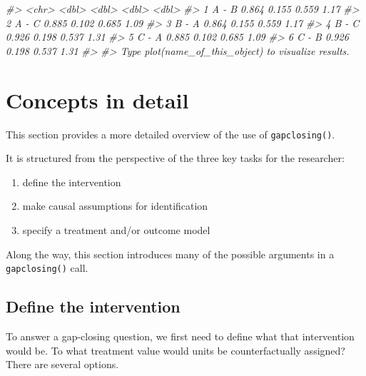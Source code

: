 \documentclass[
]{article}
\newenvironment{Shaded}{\begin{snugshade}}{\end{snugshade}}
\newcommand{\CommentTok}[1]{\textcolor[rgb]{0.56,0.35,0.01}{\textit{#1}}}
\providecommand{\tightlist}{%
  \setlength{\itemsep}{0pt}\setlength{\parskip}{0pt}}
\begin{document}
\begin{Shaded}
\begin{Highlighting}[]
\CommentTok{\#\textgreater{}   \textless{}chr\textgreater{}       \textless{}dbl\textgreater{} \textless{}dbl\textgreater{}  \textless{}dbl\textgreater{}  \textless{}dbl\textgreater{}}
\CommentTok{\#\textgreater{} 1 A {-} B       0.864 0.155  0.559   1.17}
\CommentTok{\#\textgreater{} 2 A {-} C       0.885 0.102  0.685   1.09}
\CommentTok{\#\textgreater{} 3 B {-} A       0.864 0.155  0.559   1.17}
\CommentTok{\#\textgreater{} 4 B {-} C       0.926 0.198  0.537   1.31}
\CommentTok{\#\textgreater{} 5 C {-} A       0.885 0.102  0.685   1.09}
\CommentTok{\#\textgreater{} 6 C {-} B       0.926 0.198  0.537   1.31}
\CommentTok{\#\textgreater{} }
\CommentTok{\#\textgreater{} Type plot(name\_of\_this\_object) to visualize results.}
\end{Highlighting}
\end{Shaded}

\hypertarget{concepts-in-detail}{%
\section{Concepts in detail}\label{concepts-in-detail}}

This section provides a more detailed overview of the use of \texttt{gapclosing()}.

It is structured from the perspective of the three key tasks for the researcher:

\begin{enumerate}
\def\labelenumi{\arabic{enumi}.}
\tightlist
\item
  define the intervention
\item
  make causal assumptions for identification
\item
  specify a treatment and/or outcome model
\end{enumerate}

Along the way, this section introduces many of the possible arguments in a \texttt{gapclosing()} call.

\hypertarget{define-the-intervention}{%
\subsection{Define the intervention}\label{define-the-intervention}}

To answer a gap-closing question, we first need to define what that intervention would be. To what treatment value would units be counterfactually assigned? There are several options.
\end{document}
